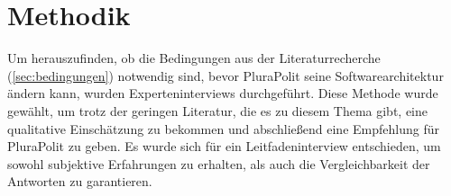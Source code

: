 \section{Methodik}
\label{sec:methodik}

Um herauszufinden, ob die Bedingungen aus der Literaturrecherche (\cref{sec:bedingungen}) notwendig sind, bevor PluraPolit seine Softwarearchitektur ändern kann, wurden Experteninterviews durchgeführt. Diese Methode wurde gewählt, um trotz der geringen Literatur, die es zu diesem Thema gibt, eine qualitative Einschätzung zu bekommen und abschließend eine Empfehlung für PluraPolit zu geben. Es wurde sich für ein Leitfadeninterview entschieden, um sowohl subjektive Erfahrungen zu erhalten, als auch die Vergleichbarkeit der Antworten zu garantieren.









